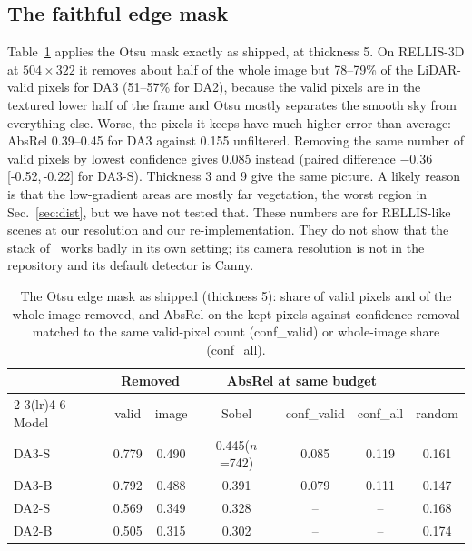 \documentclass[conference]{IEEEtran}
\newcommand{\ci}[2]{{\scriptsize[#1,\,#2]}}
\newcommand{\absrel}{AbsRel}
\newcommand{\n}[1]{{\scriptsize($n$=#1)}}
\begin{document}
\subsection{The faithful edge mask}\label{sec:otsu}
Table~\ref{tab:otsu} applies the Otsu mask exactly as shipped, at thickness 5. On RELLIS-3D at $504\times322$ it removes about half of the whole image but 78--79\% of the LiDAR-valid pixels for DA3 (51--57\% for DA2), because the valid pixels are in the textured lower half of the frame and Otsu mostly separates the smooth sky from everything else. Worse, the pixels it keeps have much higher error than average: \absrel{} 0.39--0.45 for DA3 against 0.155 unfiltered. Removing the same number of valid pixels by lowest confidence gives 0.085 instead (paired difference $-0.36$ \ci{-0.52}{-0.22} for DA3-S). Thickness 3 and 9 give the same picture. A likely reason is that the low-gradient areas are mostly far vegetation, the worst region in Sec.~\ref{sec:dist}, but we have not tested that. These numbers are for RELLIS-like scenes at our resolution and our re-implementation. They do not show that the stack of~\cite{offroadnav} works badly in its own setting; its camera resolution is not in the repository and its default detector is Canny.

\begin{table}[!t]
\caption{The Otsu edge mask as shipped (thickness 5): share of valid pixels and of the whole image removed, and \absrel{} on the kept pixels against confidence removal matched to the same valid-pixel count (conf\_valid) or whole-image share (conf\_all).}
\label{tab:otsu}
\centering
\footnotesize
\setlength{\tabcolsep}{3.5pt}
\begin{tabular}{l cc ccc c}
\toprule
 & \multicolumn{2}{c}{Removed} & \multicolumn{3}{c}{\absrel{} at same budget} & \\
\cmidrule(lr){2-3}\cmidrule(lr){4-6}
Model & valid & image & Sobel & conf\_valid & conf\_all & random \\
\midrule
DA3-S & 0.779 & 0.490 & 0.445\n{742} & 0.085 & 0.119 & 0.161 \\
DA3-B & 0.792 & 0.488 & 0.391 & 0.079 & 0.111 & 0.147 \\
DA2-S & 0.569 & 0.349 & 0.328 & -- & -- & 0.168 \\
DA2-B & 0.505 & 0.315 & 0.302 & -- & -- & 0.174 \\
\bottomrule
\end{tabular}
\end{table}
\end{document}
